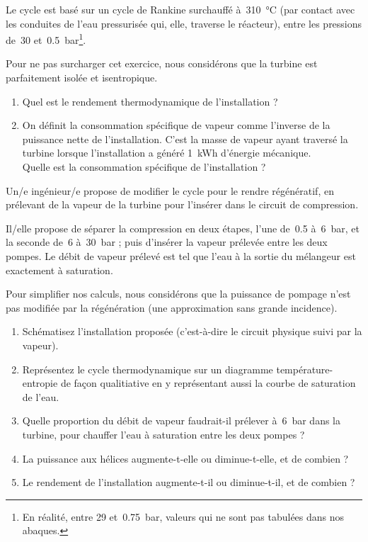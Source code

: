 	Le cycle est basé sur un cycle de Rankine surchauffé à~\SI{310}{\degreeCelsius} (par contact avec les conduites de l’eau pressurisée qui, elle, traverse le réacteur), entre les pressions de~\num{30} et~\SI{0,5}{\bar}\footnote{En réalité, entre \num{29} et~\SI{0,75}{\bar}, valeurs qui ne sont pas tabulées dans nos abaques.}.
	
	Pour ne pas surcharger cet exercice, nous considérons que la turbine est parfaitement isolée et isentropique.

	\begin{enumerate}
		\item Quel est le rendement thermodynamique de l’installation ?
		\item On définit la consommation spécifique de vapeur comme l’inverse de la puissance nette de l’installation. C’est la masse de vapeur ayant traversé la turbine lorsque l’installation a généré \SI{1}{\kWh} d’énergie mécanique.\\
			Quelle est la consommation spécifique de l’installation ?
	\end{enumerate}

	\onlyframabook{\pagebreak}
	Un/e ingénieur/e propose de modifier le cycle pour le rendre régénératif, en prélevant de la vapeur de la turbine pour l’insérer dans le circuit de compression.
	
	Il/elle propose de séparer la compression en deux étapes, l’une de~\num{0,5} à~\SI{6}{\bar}, et la seconde de~\num{6} à~\SI{30}{\bar} ; puis d’insérer la vapeur prélevée entre les deux pompes. Le débit de vapeur prélevé est tel que l’eau à la sortie du mélangeur est exactement à saturation.
	
	Pour simplifier nos calculs, nous considérons que la puissance de pompage n’est pas modifiée par la régénération (une approximation sans grande incidence).
	
	\begin{enumerate}	
		\item Schématisez l’installation proposée (c’est-à-dire le circuit physique suivi par la vapeur).
		\item Représentez le cycle thermodynamique sur un diagramme température-entropie de façon qualitiative en y représentant aussi la courbe de saturation de l’eau.
		\item Quelle proportion du débit de vapeur faudrait-il prélever à~\SI{6}{\bar} dans la turbine, pour chauffer l’eau à saturation entre les deux pompes ?
		\item La puissance aux hélices augmente-t-elle ou diminue-t-elle, et de combien ?
		\item Le rendement de l’installation augmente-t-il ou diminue-t-il, et de combien ?
	\end{enumerate}

